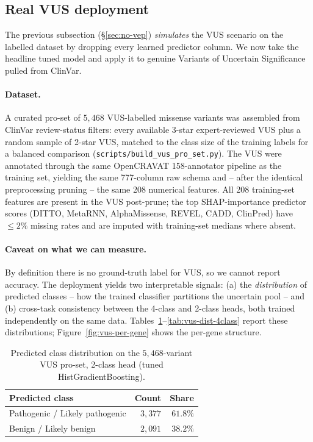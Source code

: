 \documentclass[11pt,a4paper]{article}
\begin{document}
\subsection{Real VUS deployment}
\label{sec:vus-deployment}

The previous subsection (\S\ref{sec:no-vep}) \emph{simulates} the VUS scenario
on the labelled dataset by dropping every learned predictor column. We now
take the headline tuned model and apply it to genuine Variants of Uncertain
Significance pulled from ClinVar.

\paragraph{Dataset.}
A curated pro-set of $5{,}468$ VUS-labelled missense variants was assembled
from ClinVar review-status filters: every available 3-star expert-reviewed
VUS plus a random sample of 2-star VUS, matched to the class size of the
training labels for a balanced comparison (\texttt{scripts/build\_vus\_pro\_set.py}).
The VUS were annotated through the same OpenCRAVAT 158-annotator pipeline as
the training set, yielding the same 777-column raw schema and -- after the
identical preprocessing pruning -- the same 208 numerical features. All 208
training-set features are present in the VUS post-prune; the top
SHAP-importance predictor scores (DITTO, MetaRNN, AlphaMissense, REVEL,
CADD, ClinPred) have $\le 2\%$ missing rates and are imputed with
training-set medians where absent.

\paragraph{Caveat on what we can measure.}
By definition there is no ground-truth label for VUS, so we cannot report
accuracy. The deployment yields two interpretable signals: (a) the
\emph{distribution} of predicted classes -- how the trained classifier
partitions the uncertain pool -- and (b) cross-task consistency between
the 4-class and 2-class heads, both trained independently on the same data.
Tables~\ref{tab:vus-dist-2class}--\ref{tab:vus-dist-4class} report these
distributions; Figure~\ref{fig:vus-per-gene} shows the per-gene structure.

\begin{table}[H]
\centering
\caption{Predicted class distribution on the $5{,}468$-variant VUS pro-set,
2-class head (tuned HistGradientBoosting).}
\label{tab:vus-dist-2class}
\small
\begin{tabular}{lrr}
\toprule
Predicted class & Count & Share \\
\midrule
Pathogenic / Likely pathogenic & $3{,}377$ & $61.8\%$ \\
Benign / Likely benign         & $2{,}091$ & $38.2\%$ \\
\bottomrule
\end{tabular}
\end{table}
\end{document}
